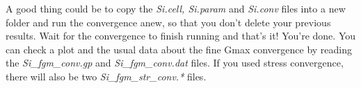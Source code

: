 \documentclass[10pt]{article}
\begin{document}
A good thing could be to copy the \textit{Si.cell, Si.param} and \textit{Si.conv} files into a new folder and run the convergence anew, so that you don't delete your previous results. Wait for the convergence to finish running and that's it! You're done. You can check a plot and the usual data about the fine Gmax convergence by reading the \textit{Si_fgm_conv.gp} and \textit{Si_fgm_conv.dat} files. If you used stress convergence, there will also be two \textit{Si_fgm_str_conv.*} files.
\end{document}
